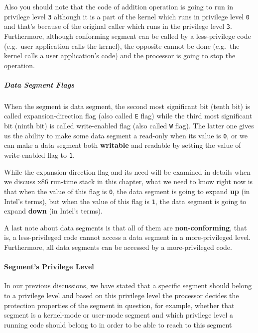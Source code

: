 Also you should note that the code of addition operation is going to run
in privilege level \lstinline!3! although it is a part of the kernel
which runs in privilege level \lstinline!0! and that's because of the
original caller which runs in the privilege level \lstinline!3!.
Furthermore, although conforming segment can be called by a
less-privilege code (e.g.~user application calls the kernel), the
opposite cannot be done (e.g.~the kernel calls a user application's
code) and the processor is going to stop the operation.

\subparagraph{Data Segment Flags}\label{data-segment-flags}

When the segment is data segment, the second most significant bit (tenth
bit) is called expansion-direction flag (also called \lstinline!E! flag)
while the third most significant bit (ninth bit) is called write-enabled
flag (also called \lstinline!W! flag). The latter one gives us the
ability to make some data segment a read-only when its value is
\lstinline!0!, or we can make a data segment both \textbf{writable} and
readable by setting the value of write-enabled flag to \lstinline!1!.

While the expansion-direction flag and its need will be examined in
details when we discuss x86 run-time stack in this chapter, what we need
to know right now is that when the value of this flag is \lstinline!0!,
the data segment is going to expand \textbf{up} (in Intel's terms), but
when the value of this flag is \lstinline!1!, the data segment is going
to expand \textbf{down} (in Intel's terms).

A last note about data segments is that all of them are
\textbf{non-conforming}, that is, a less-privileged code cannot access a
data segment in a more-privileged level. Furthermore, all data segments
can be accessed by a more-privileged code.

\paragraph{Segment's Privilege Level}\label{segments-privilege-level}

In our previous discussions, we have stated that a specific segment
should belong to a privilege level and based on this privilege level the
processor decides the protection properties of the segment in question,
for example, whether that segment is a kernel-mode or user-mode segment
and which privilege level a running code should belong to in order to be
able to reach to this segment

